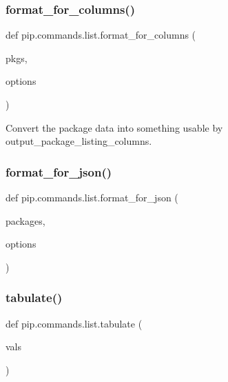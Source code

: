 \subsubsection{\texorpdfstring{format\+\_\+for\+\_\+columns()}{format\_for\_columns()}}
{\footnotesize\ttfamily def pip.\+commands.\+list.\+format\+\_\+for\+\_\+columns (\begin{DoxyParamCaption}\item[{}]{pkgs,  }\item[{}]{options }\end{DoxyParamCaption})}

\begin{DoxyVerb}Convert the package data into something usable
by output_package_listing_columns.
\end{DoxyVerb}
 \mbox{\label{namespacepip_1_1commands_1_1list_a94998218d23a2605a7c1ac3c849260c7}} 
\subsubsection{\texorpdfstring{format\+\_\+for\+\_\+json()}{format\_for\_json()}}
{\footnotesize\ttfamily def pip.\+commands.\+list.\+format\+\_\+for\+\_\+json (\begin{DoxyParamCaption}\item[{}]{packages,  }\item[{}]{options }\end{DoxyParamCaption})}

\mbox{\label{namespacepip_1_1commands_1_1list_a828a23c945549303dc37dab4964f32c5}} 
\subsubsection{\texorpdfstring{tabulate()}{tabulate()}}
{\footnotesize\ttfamily def pip.\+commands.\+list.\+tabulate (\begin{DoxyParamCaption}\item[{}]{vals }\end{DoxyParamCaption})}



